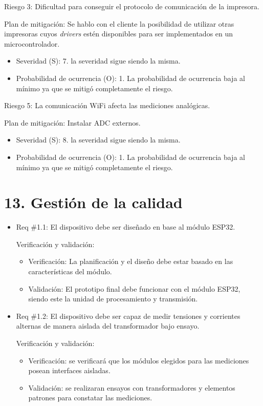 \documentclass[11pt]{charter}
\begin{document}
Riesgo 3: Dificultad para conseguir el protocolo de comunicación de la impresora.

Plan de mitigación: Se hablo con el cliente la posibilidad de utilizar otras impresoras cuyos \textit{drivers} estén disponibles para ser implementados en un microcontrolador.
\begin{itemize}
\item Severidad (S): 7. la severidad sigue siendo la misma.
\item Probabilidad de ocurrencia (O): 1. La probabilidad de ocurrencia baja al mínimo ya que se mitigó completamente el riesgo.
\end{itemize}

Riesgo 5: La comunicación WiFi afecta las mediciones analógicas.

Plan de mitigación: Instalar ADC externos.
\begin{itemize}
\item Severidad (S): 8. la severidad sigue siendo la misma.
\item Probabilidad de ocurrencia (O): 1. La probabilidad de ocurrencia baja al mínimo ya que se mitigó completamente el riesgo.
\end{itemize}

\section{13. Gestión de la calidad}
\label{sec:calidad}


\begin{itemize} 
\item Req \#1.1: El dispositivo debe ser diseñado en base al módulo ESP32.

Verificación y validación:

\begin{itemize}
\item Verificación: La planificación y el diseño debe estar basado en las características del módulo.
\item Validación: El prototipo final debe funcionar con el módulo ESP32, siendo este la unidad de procesamiento y transmisión.
\end{itemize}

\end{itemize}

\begin{itemize} 
\item Req \#1.2: El dispositivo debe ser capaz de medir tensiones y corrientes alternas de manera aislada del transformador bajo ensayo.

Verificación y validación:

\begin{itemize}
\item Verificación: se verificará que los módulos elegidos para las mediciones posean interfaces aisladas.
\item Validación: se realizaran ensayos con transformadores y elementos patrones para constatar las mediciones.  
\end{itemize}

\end{itemize}
\end{document}
